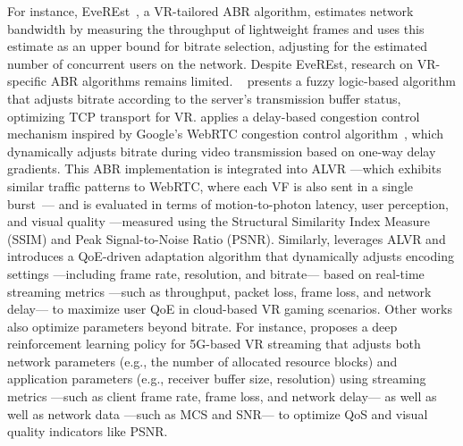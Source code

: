 For instance, EveREst~\cite{liubogoshchev2021everest, korneev2024model}, a VR-tailored ABR algorithm, estimates network bandwidth by measuring the throughput of lightweight frames and uses this estimate as an upper bound for bitrate selection, adjusting for the estimated number of concurrent users on the network. Despite EveREst, research on VR-specific ABR algorithms remains limited. ~\cite{vergados2023adaptive} presents a fuzzy logic-based algorithm that adjusts bitrate according to the server’s transmission buffer status, optimizing TCP transport for VR. \cite{alhilal2024fovoptix} applies a delay-based congestion control mechanism inspired by Google's WebRTC congestion control algorithm~\cite{GCC-webrtc}, which dynamically adjusts bitrate during video transmission based on one-way delay gradients. This ABR implementation is integrated into ALVR ---which exhibits similar traffic patterns to WebRTC, where each VF is also sent in a single burst~\cite{carrascosa2022cloud, casasnovas2024experimental}--- and is evaluated in terms of motion-to-photon latency, user perception, and visual quality ---measured using the Structural Similarity Index Measure (SSIM) and Peak Signal-to-Noise Ratio (PSNR). Similarly, \cite{lee2024adaptive} leverages ALVR and introduces a QoE-driven adaptation algorithm that dynamically adjusts encoding settings ---including frame rate, resolution, and bitrate--- based on real-time streaming metrics ---such as throughput, packet loss, frame loss, and network delay--- to maximize user QoE in cloud-based VR gaming scenarios.
Other works also optimize parameters beyond bitrate. For instance, \cite{ALVR_5G_DQN} proposes a deep reinforcement learning policy for 5G-based VR streaming that adjusts both network parameters (e.g., the number of allocated resource blocks) and application parameters (e.g., receiver buffer size, resolution) using streaming metrics ---such as client frame rate, frame loss, and network delay--- as well as well as network data ---such as MCS and SNR--- to optimize QoS and visual quality indicators like PSNR.

